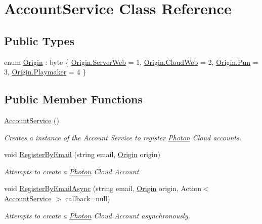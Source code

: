 \hypertarget{class_account_service}{}\section{Account\+Service Class Reference}
\label{class_account_service}
\subsection*{Public Types}
\begin{DoxyCompactItemize}
\item 
enum \hyperlink{class_account_service_ad255ee623b704af8d6995bd2a6eca292}{Origin} \+: byte \{ \hyperlink{class_account_service_ad255ee623b704af8d6995bd2a6eca292ae7a3a8e2f3e15102959481b9c2334647}{Origin.\+Server\+Web} = 1, 
\hyperlink{class_account_service_ad255ee623b704af8d6995bd2a6eca292af704e8ac42b36e2873466f04fb12be26}{Origin.\+Cloud\+Web} = 2, 
\hyperlink{class_account_service_ad255ee623b704af8d6995bd2a6eca292a6644a7352d32c9c4443017798130b61f}{Origin.\+Pun} = 3, 
\hyperlink{class_account_service_ad255ee623b704af8d6995bd2a6eca292af9c18932d87693c2cdfd5c6042b27687}{Origin.\+Playmaker} = 4
 \}
\end{DoxyCompactItemize}
\subsection*{Public Member Functions}
\begin{DoxyCompactItemize}
\item 
\hyperlink{class_account_service_af440e845bf59207f2abab64155ac78fd}{Account\+Service} ()
\begin{DoxyCompactList}\small\item\em Creates a instance of the Account Service to register \hyperlink{namespace_photon}{Photon} Cloud accounts. \end{DoxyCompactList}\item 
void \hyperlink{class_account_service_a879044e72d8362127dd106cef0dee0a6}{Register\+By\+Email} (string email, \hyperlink{class_account_service_ad255ee623b704af8d6995bd2a6eca292}{Origin} origin)
\begin{DoxyCompactList}\small\item\em Attempts to create a \hyperlink{namespace_photon}{Photon} Cloud Account. \end{DoxyCompactList}\item 
void \hyperlink{class_account_service_a21f4161e664bf917292634c78d96d343}{Register\+By\+Email\+Async} (string email, \hyperlink{class_account_service_ad255ee623b704af8d6995bd2a6eca292}{Origin} origin, Action$<$ \hyperlink{class_account_service}{Account\+Service} $>$ callback=null)
\begin{DoxyCompactList}\small\item\em Attempts to create a \hyperlink{namespace_photon}{Photon} Cloud Account asynchronously. \end{DoxyCompactList}\end{DoxyCompactItemize}
